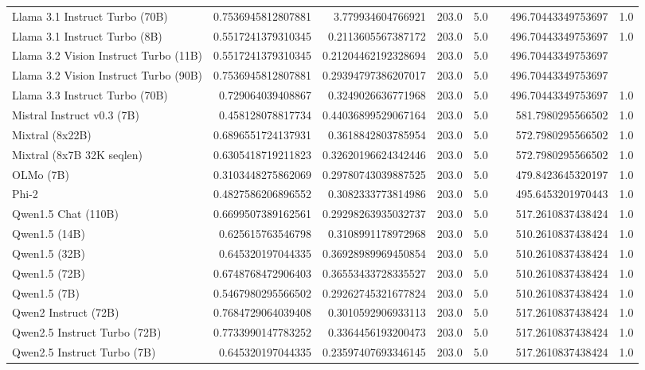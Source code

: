\begin{table}[htp]
{\begin{tabular}{lrrrrrrr}
Llama 3.1 Instruct Turbo (70B) & 0.7536945812807881 & 3.779934604766921 & 203.0 & 5.0 &  & 496.70443349753697 & 1.0 \\
Llama 3.1 Instruct Turbo (8B) & 0.5517241379310345 & 0.2113605567387172 & 203.0 & 5.0 &  & 496.70443349753697 & 1.0 \\
Llama 3.2 Vision Instruct Turbo (11B) & 0.5517241379310345 & 0.21204462192328694 & 203.0 & 5.0 &  & 496.70443349753697 &  \\
Llama 3.2 Vision Instruct Turbo (90B) & 0.7536945812807881 & 0.29394797386207017 & 203.0 & 5.0 &  & 496.70443349753697 &  \\
Llama 3.3 Instruct Turbo (70B) & 0.729064039408867 & 0.3249026636771968 & 203.0 & 5.0 &  & 496.70443349753697 & 1.0 \\
Mistral Instruct v0.3 (7B) & 0.458128078817734 & 0.44036899529067164 & 203.0 & 5.0 &  & 581.7980295566502 & 1.0 \\
Mixtral (8x22B) & 0.6896551724137931 & 0.3618842803785954 & 203.0 & 5.0 &  & 572.7980295566502 & 1.0 \\
Mixtral (8x7B 32K seqlen) & 0.6305418719211823 & 0.32620196624342446 & 203.0 & 5.0 &  & 572.7980295566502 & 1.0 \\
OLMo (7B) & 0.3103448275862069 & 0.29780743039887525 & 203.0 & 5.0 &  & 479.8423645320197 & 1.0 \\
Phi-2 & 0.4827586206896552 & 0.3082333773814986 & 203.0 & 5.0 &  & 495.6453201970443 & 1.0 \\
Qwen1.5 Chat (110B) & 0.6699507389162561 & 0.29298263935032737 & 203.0 & 5.0 &  & 517.2610837438424 & 1.0 \\
Qwen1.5 (14B) & 0.625615763546798 & 0.3108991178972968 & 203.0 & 5.0 &  & 510.2610837438424 & 1.0 \\
Qwen1.5 (32B) & 0.645320197044335 & 0.36928989969450854 & 203.0 & 5.0 &  & 510.2610837438424 & 1.0 \\
Qwen1.5 (72B) & 0.6748768472906403 & 0.36553433728335527 & 203.0 & 5.0 &  & 510.2610837438424 & 1.0 \\
Qwen1.5 (7B) & 0.5467980295566502 & 0.29262745321677824 & 203.0 & 5.0 &  & 510.2610837438424 & 1.0 \\
Qwen2 Instruct (72B) & 0.7684729064039408 & 0.3010592906933113 & 203.0 & 5.0 &  & 517.2610837438424 & 1.0 \\
Qwen2.5 Instruct Turbo (72B) & 0.7733990147783252 & 0.3364456193200473 & 203.0 & 5.0 &  & 517.2610837438424 & 1.0 \\
Qwen2.5 Instruct Turbo (7B) & 0.645320197044335 & 0.23597407693346145 & 203.0 & 5.0 &  & 517.2610837438424 & 1.0 \\

\end{tabular}}
\end{table}
